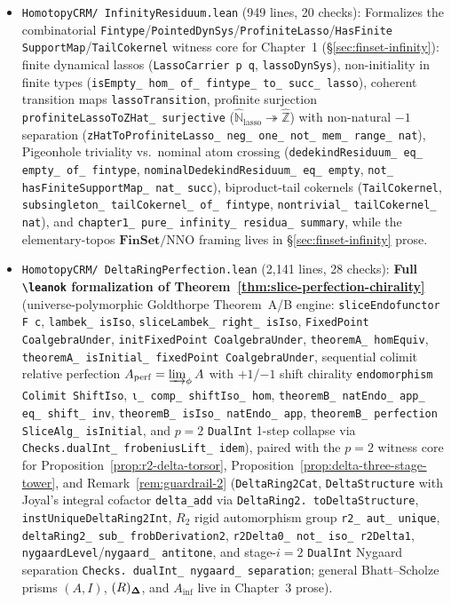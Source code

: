 \begin{itemize}
  \item \texttt{HomotopyCRM/ InfinityResiduum.lean} (949 lines, 20 checks): Formalizes the combinatorial \texttt{Fintype}/\texttt{PointedDynSys}/\texttt{ProfiniteLasso}/\texttt{HasFinite SupportMap}/\texttt{TailCokernel} witness core for Chapter~1 (\S\ref{sec:finset-infinity}): finite dynamical lassos (\texttt{LassoCarrier p q}, \texttt{lassoDynSys}), non-initiality in finite types (\texttt{isEmpty\_ hom\_ of\_ fintype\_ to\_ succ\_ lasso}), coherent transition maps \texttt{lassoTransition}, profinite surjection \texttt{profiniteLassoToZHat\_ surjective} ($\widehat{\mathbb{N}}_{\mathrm{lasso}} \twoheadrightarrow \widehat{\mathbb{Z}}$) with non-natural $-1$ separation (\texttt{zHatToProfiniteLasso\_ neg\_ one\_ not\_ mem\_ range\_ nat}), Pigeonhole triviality vs.\ nominal atom crossing (\texttt{dedekindResiduum\_ eq\_ empty\_ of\_ fintype}, \texttt{nominalDedekindResiduum\_ eq\_ empty}, \texttt{not\_ hasFiniteSupportMap\_ nat\_ succ}), biproduct-tail cokernels (\texttt{TailCokernel}, \texttt{subsingleton\_ tailCokernel\_ of\_ fintype}, \texttt{nontrivial\_ tailCokernel\_ nat}), and \texttt{chapter1\_ pure\_ infinity\_ residua\_ summary}, while the elementary-topos $\mathbf{FinSet}/\mathrm{NNO}$ framing lives in \S\ref{sec:finset-infinity} prose.
  \item \texttt{HomotopyCRM/ DeltaRingPerfection.lean} (2,141 lines, 28 checks): \textbf{Full \texttt{\textbackslash leanok} formalization of Theorem~\ref{thm:slice-perfection-chirality}} (universe-polymorphic Goldthorpe Theorem~A/B engine: \texttt{sliceEndofunctor F c}, \texttt{lambek\_ isIso}, \texttt{sliceLambek\_ right\_ isIso}, \texttt{FixedPoint CoalgebraUnder}, \texttt{initFixedPoint CoalgebraUnder}, \texttt{theoremA\_ homEquiv}, \texttt{theoremA\_ isInitial\_ fixedPoint CoalgebraUnder}, sequential colimit relative perfection $A_{\mathrm{perf}} = \varinjlim_\phi A$ with $+1$/$-1$ shift chirality \texttt{endomorphism Colimit ShiftIso}, \texttt{ι\_ comp\_ shiftIso\_ hom}, \texttt{theoremB\_ natEndo\_ app\_ eq\_ shift\_ inv}, \texttt{theoremB\_ isIso\_ natEndo\_ app}, \texttt{theoremB\_ perfection SliceAlg\_ isInitial}, and $p=2$ \texttt{DualInt} 1-step collapse via \texttt{Checks.dualInt\_ frobeniusLift\_ idem}), paired with the $p=2$ witness core for Proposition~\ref{prop:r2-delta-torsor}, Proposition~\ref{prop:delta-three-stage-tower}, and Remark~\ref{rem:guardrail-2} (\texttt{DeltaRing2Cat}, \texttt{DeltaStructure} with Joyal's integral cofactor \texttt{delta\_add} via \texttt{DeltaRing2. toDeltaStructure}, \texttt{instUniqueDeltaRing2Int}, $R_2$ rigid automorphism group \texttt{r2\_ aut\_ unique}, \texttt{deltaRing2\_ sub\_ frobDerivation2}, \texttt{r2Delta0\_ not\_ iso\_ r2Delta1}, \texttt{nygaardLevel}/\texttt{nygaard\_ antitone}, and stage-$i=2$ \texttt{DualInt} Nygaard separation \texttt{Checks. dualInt\_ nygaard\_ separation}; general Bhatt--Scholze prisms $(A,I)$, $(R)_{\mathbf{\Delta}}$, and $A_{\mathrm{inf}}$ live in Chapter~3 prose).

\end{itemize}
